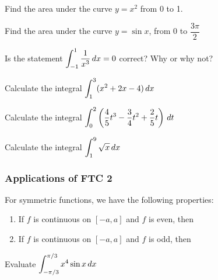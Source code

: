 \documentclass[notes]{subfiles}
\begin{document}
		\begin{ex}
			Find the area under the curve \(y = x^2\) from 0 to 1.
		\end{ex}
			\newpage

		\begin{ex}
			Find the area under the curve \(y = \sin x\), from \(0\) to \(\dfrac{3\pi}{2}\)
		\end{ex}
			
		\begin{ex}
			Is the statement \(\displaystyle \int_{-1}^1 \dfrac{1}{x^3}\, dx = 0\) correct?  Why or why not?
		\end{ex}
			
		\begin{ex}
			Calculate the integral \(\displaystyle \int_1^3 (x^2+2x-4)\, dx\)
		\end{ex}
			
		\begin{ex}
			Calculate the integral \(\displaystyle \int_0^2 \left( \dfrac{4}{5}t^3-\dfrac{3}{4}t^2+\dfrac{2}{5}t\right)\,dt\)
		\end{ex}
			\newpage
			
		\begin{ex}
			Calculate the integral \(\displaystyle \int_1^9 \sqrt{x}\,dx\)
		\end{ex}
	
	\subsubsection*{Applications of FTC 2}
		\begin{rmk}
			For symmetric functions, we have the following properties:\\
				\begin{enumerate}[(1)]
				\setlength\itemsep{5pt}
					\item If \(f\) is continuous on \([-a,a]\) and \(f\) is even, then\vspace{.75in}
					\item If \(f\) is continuous on \([-a,a]\) and \(f\) is odd, then\vspace{.75in}
				\end{enumerate}
		\end{rmk}
		
		\begin{ex}
			Evaluate \(\displaystyle \int_{-\pi/3}^{\pi/3} x^4\sin x\,dx\)
		\end{ex}
			
\end{document}
